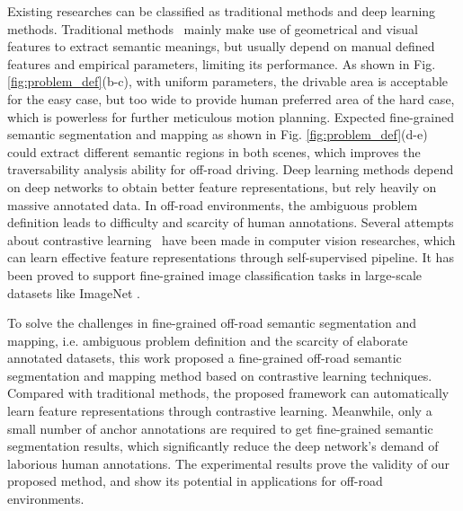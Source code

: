\documentclass[letterpaper, 10 pt, conference]{ieeeconf}  %
\begin{document}
Existing researches can be classified as traditional methods and deep learning methods.
Traditional methods~\cite{thrun2006stanley}\cite{zhang2010lidar} mainly make use of geometrical and visual features to extract semantic meanings, but usually depend on manual defined features and empirical parameters, limiting its performance. As shown in Fig. \ref{fig:problem_def}(b-c), with uniform parameters, the drivable area is acceptable for the easy case, but too wide to provide human preferred area of the hard case, which is powerless for further meticulous motion planning. Expected fine-grained semantic segmentation and mapping as shown in Fig. \ref{fig:problem_def}(d-e) could extract different semantic regions in both scenes, which improves the traversability analysis ability for off-road driving.
Deep learning methods \cite{siam2017deep} depend on deep networks to obtain better feature representations, but rely heavily on massive annotated data. In off-road environments, the ambiguous problem definition leads to difficulty and scarcity of human annotations.
Several attempts about contrastive learning~\cite{oord2018CPC}\cite{chen2020simple}\cite{he2020momentum} have been made in computer vision researches, which can learn effective feature representations through self-supervised pipeline. It has been proved to support fine-grained image classification tasks in large-scale datasets like ImageNet \cite{deng2009imagenet}.

To solve the challenges in fine-grained off-road semantic segmentation and mapping, i.e. ambiguous problem definition and the scarcity of elaborate annotated datasets, this work proposed a fine-grained off-road semantic segmentation and mapping method based on contrastive learning techniques. Compared with traditional methods, the proposed framework can automatically learn feature representations through contrastive learning. Meanwhile, only a small number of anchor annotations are required to get fine-grained semantic segmentation results, which significantly reduce the deep network's demand of laborious human annotations. The experimental results prove the validity of our proposed method, and show its potential in applications for off-road environments.
\end{document}
